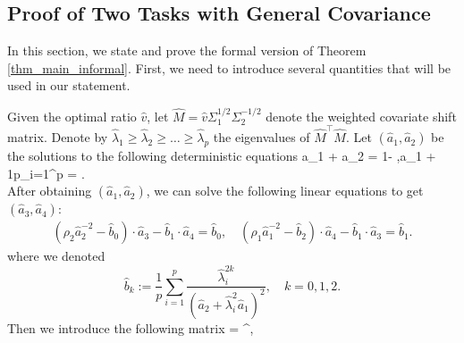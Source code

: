 \subsection{Proof of Two Tasks with General Covariance}\label{app_proof_main}


In this section, we state and prove the formal version of Theorem \ref{thm_main_informal}. First, we need to introduce several quantities that will be used in our statement.

Given the optimal ratio $\hat v$, let $\hat{M} = \hat{v} \Sigma_1^{1/2}\Sigma_2^{-1/2}$ denote the weighted covariate shift matrix. Denote by ${\hat\lambda}_1\ge {\hat\lambda}_2 \ge \dots \ge {\hat\lambda}_p$ the eigenvalues of $\hat{M}^{\top}\hat{M}$. Let $(\hat a_1, \hat a_2)$ be the solutions to the following deterministic equations
	\be
		 \hat a_1 +  \hat a_2 = 1- ,\quad  \hat a_1 + \cdot \frac1p\sum_{i=1}^p  = .\label{eq_a2} \\
		 \ee
		 After obtaining $(\hat a_1,\hat a_2)$, we can solve the following linear equations to get $(\hat a_3,\hat a_4)$:
\begin{gather}
		\left(\rho_2 \hat a_2^{-2}- \hat b_0\right)\cdot \hat  a_3 - \hat b_1 \cdot \hat a_4
		=\hat b_0, \quad \left(\rho_1\hat a_1^{-2} - \hat b_2  \right)\cdot \hat a_4 - \hat b_1 \cdot \hat a_3 =\hat b_1 .\label{eq_a3} 
	\end{gather}
where we denoted
$$\hat b_k:= \frac1{p}\sum_{i=1}^p \frac{\hat \lambda_i^{2k}}{ (\hat a_2 +\hat  \lambda_i^2\hat a_1)^2  },\quad k=0,1,2.$$
Then we introduce the following matrix
\be\label{defnpihat}\Pi =   ^{\top},\ee
